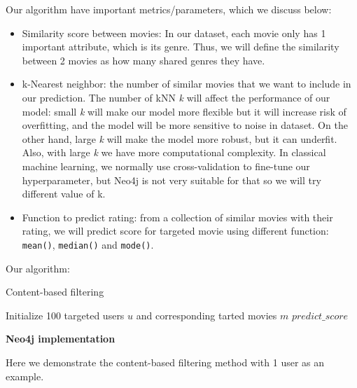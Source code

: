\documentclass{article}
\begin{document}
Our algorithm have important metrics/parameters, which we discuss below: 

\begin{itemize}
    \item Similarity score between movies: In our dataset, each movie only has 1 important attribute, which is its genre. Thus, we will define the similarity between 2 movies as how many shared genres they have.

    \item k-Nearest neighbor: the number of similar movies that we want to include in our prediction. The number of kNN \textit{k} will affect the performance of our model: small \textit{k} will make our model more flexible but it will increase risk of overfitting, and the model will be more sensitive to noise in dataset. On the other hand, large \textit{k} will make the model more robust, but it can underfit. Also, with large \textit{k} we have more computational complexity. In classical machine learning, we normally use cross-validation to fine-tune our hyperparameter, but Neo4j is not very suitable for that so we will try different value of k. 

    \item Function to predict rating: from a collection of similar movies with their rating, we will predict score for targeted movie using different function: \texttt{mean()}, \texttt{median()} and \texttt{mode()}. 
\end{itemize}

Our algorithm: 

\begin{algorithm}[H]
\caption{Content-based filtering}
Initialize 100 targeted users $u$ and corresponding tarted movies $m$\;
\Return $predict\_score$\;
\end{algorithm}
\vspace{1mm}
\textbf{Neo4j implementation}

Here we demonstrate the content-based filtering method with 1 user as an example. 
\end{document}
